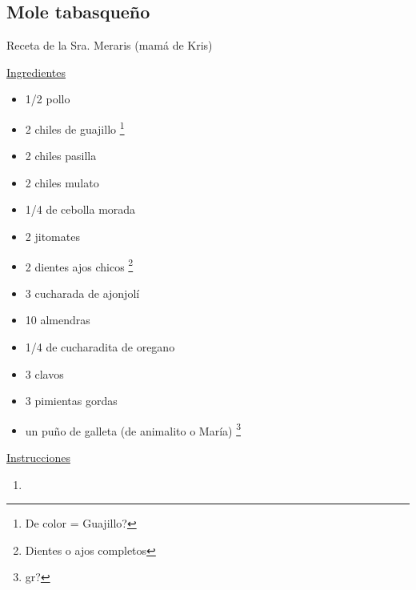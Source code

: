 \subsection{Mole tabasqueño}

Receta de la Sra. Meraris (mamá de Kris)








\underline{Ingredientes}
\begin{itemize}
\item \num{1/2} pollo
\item 2 chiles de guajillo \footnote{De color = Guajillo?}
\item 2 chiles pasilla
\item 2 chiles mulato
\item \num{1/4} de cebolla morada
\item 2 jitomates
\item 2 dientes ajos chicos \footnote{Dientes o ajos completos}
\item 3 cucharada de ajonjolí
\item 10 almendras
\item \num{1/4} de cucharadita de oregano
\item 3 clavos
\item 3 pimientas gordas
\item un puño de galleta (de animalito o María) \footnote{gr?}
\end{itemize}

\underline{Instrucciones}
\begin{enumerate}
\item 
\end{enumerate}